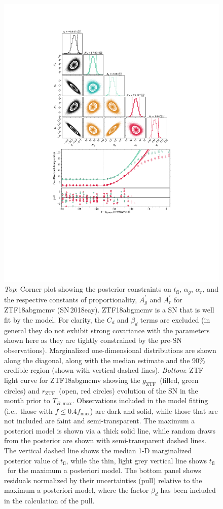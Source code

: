 \documentclass[twocolumn]{aastex63}
\newcommand{\rztf}{$r_\mathrm{ZTF}$}
\newcommand{\gztf}{$g_\mathrm{ZTF}$}
\newcommand{\tfl}{$t_\mathrm{fl}$}
\newcommand{\tbmax}{$T_{B,\mathrm{max}}$}
\begin{document}
\begin{figure}
    \centering
    \includegraphics[width=5.2in]{./figures/Fig1.pdf}
    \caption{\textit{Top}: Corner plot showing the posterior constraints on
    \tfl, $\alpha_g$, $\alpha_r$, and the respective constants of
    proportionality, $A_g^\prime$ and $A_r^\prime$ for ZTF18abgmcmv
    (SN\,2018eay). ZTF18abgmcmv is a SN that is well fit by the model. For
    clarity, the $C_d$ and $\beta_d$ terms are excluded (in general they do
    not exhibit strong covariance with the parameters shown here as they are
    tightly constrained by the pre-SN observations). Marginalized
    one-dimensional distributions are shown along the diagonal, along with the
    median estimate and the 90\% credible region (shown with vertical dashed
    lines). \textit{Bottom}: ZTF light curve for ZTF18abgmcmv showing the
    \gztf\ (filled, green circles) and \rztf\ (open, red circles) evolution of
    the SN in the month prior to \tbmax. Observations included in the model
    fitting (i.e., those with $f \le 0.4 f_\mathrm{max}$) are dark and solid,
    while those that are not included are faint and semi-transparent. The
    maximum a posteriori model is shown via a thick solid line, while random
    draws from the posterior are shown with semi-transparent dashed lines. The
    vertical dashed line shows the median 1-D marginalized posterior value of
    \tfl, while the thin, light grey vertical line shows \tfl\ for the maximum
    a posteriori model. The bottom panel shows residuals normalized by their
    uncertainties (pull) relative to the maximum a posteriori model, where the
    factor $\beta_d$ has been included in the calculation of the pull.}
    \label{fig:corner_good}
\end{figure}
\end{document}
